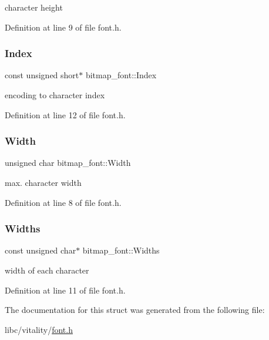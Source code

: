 character height 



Definition at line 9 of file font.\+h.

\mbox{\label{a00162_a72c4ded43e9810921241d01911e9d3f5_a72c4ded43e9810921241d01911e9d3f5}} 
\subsubsection{\texorpdfstring{Index}{Index}}
{\footnotesize\ttfamily const unsigned short$\ast$ bitmap\+\_\+font\+::\+Index}



encoding to character index 



Definition at line 12 of file font.\+h.

\mbox{\label{a00162_a5fd6d0a33019bd0f6bd8fddb781d0fb6_a5fd6d0a33019bd0f6bd8fddb781d0fb6}} 
\subsubsection{\texorpdfstring{Width}{Width}}
{\footnotesize\ttfamily unsigned char bitmap\+\_\+font\+::\+Width}



max. character width 



Definition at line 8 of file font.\+h.

\mbox{\label{a00162_a3a1e3ffc2049965887e2bd1381f8b92d_a3a1e3ffc2049965887e2bd1381f8b92d}} 
\subsubsection{\texorpdfstring{Widths}{Widths}}
{\footnotesize\ttfamily const unsigned char$\ast$ bitmap\+\_\+font\+::\+Widths}



width of each character 



Definition at line 11 of file font.\+h.



The documentation for this struct was generated from the following file\+:\begin{DoxyCompactItemize}
\item 
libc/vitality/\hyperlink{a00101}{font.\+h}\end{DoxyCompactItemize}
